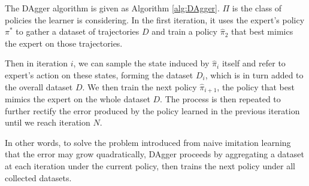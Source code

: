 \documentclass[twoside]{article}
\begin{document}
The DAgger algorithm is given as Algorithm \ref{alg:DAgger}.
$\Pi$ is the class of policies the learner is considering.
In the first iteration, it uses the expert's policy $\pi^*$ to gather
a dataset of trajectories $D$ and train a policy $\hat{\pi}_2$ that best mimics the expert on those trajectories. 

Then in iteration $i$, we can sample the state induced by $\hat{\pi}_i$ itself and refer to expert's action on these states, forming the dataset $D_i$, which is in turn added to the overall dataset $D$. We then train the next policy $\hat{\pi}_{i+1}$, the policy that best mimics the expert on the whole dataset $D$. The process is then repeated to further rectify the error produced by the policy learned in the previous iteration until we reach iteration $N$.

In other words, to solve the problem introduced from naive imitation learning that the error may grow quadratically, DAgger proceeds by aggregating a dataset at each iteration under the current policy, then trains the next policy under all collected datasets. 








\end{document}
